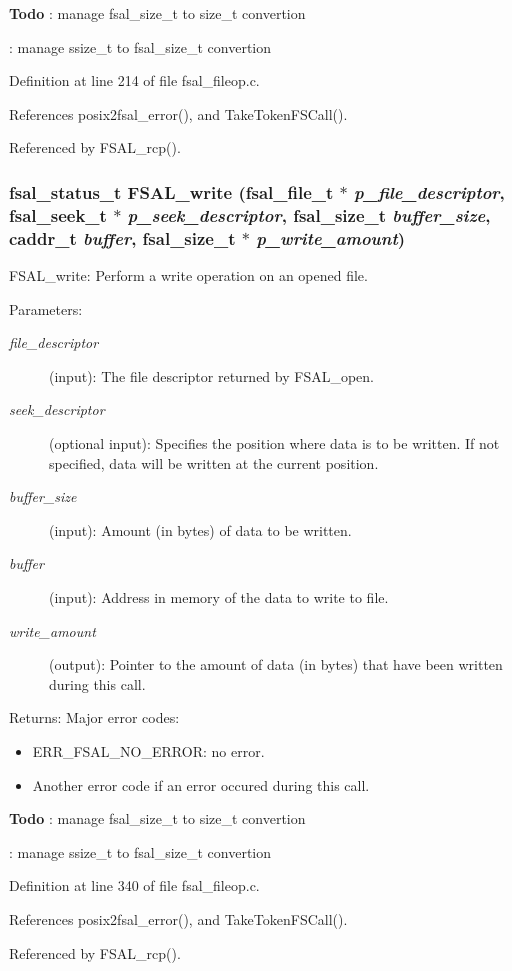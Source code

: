\begin{Desc}
\item[{\bf Todo}]: manage fsal\_\-size\_\-t to size\_\-t convertion 

: manage ssize\_\-t to fsal\_\-size\_\-t convertion\end{Desc}


Definition at line 214 of file fsal\_\-fileop.c.

References posix2fsal\_\-error(), and Take\-Token\-FSCall().

Referenced by FSAL\_\-rcp().
\subsubsection{\setlength{\rightskip}{0pt plus 5cm}fsal\_\-status\_\-t FSAL\_\-write (fsal\_\-file\_\-t $\ast$ {\em p\_\-file\_\-descriptor}, fsal\_\-seek\_\-t $\ast$ {\em p\_\-seek\_\-descriptor}, fsal\_\-size\_\-t {\em buffer\_\-size}, caddr\_\-t {\em buffer}, fsal\_\-size\_\-t $\ast$ {\em p\_\-write\_\-amount})}\label{fsal__fileop_8c_a3}


FSAL\_\-write: Perform a write operation on an opened file.

\begin{Desc}
\item[Parameters:]
\begin{description}
\item[{\em file\_\-descriptor}](input): The file descriptor returned by FSAL\_\-open. \item[{\em seek\_\-descriptor}](optional input): Specifies the position where data is to be written. If not specified, data will be written at the current position. \item[{\em buffer\_\-size}](input): Amount (in bytes) of data to be written. \item[{\em buffer}](input): Address in memory of the data to write to file. \item[{\em write\_\-amount}](output): Pointer to the amount of data (in bytes) that have been written during this call.\end{description}
\end{Desc}
\begin{Desc}
\item[Returns:]Major error codes:\begin{itemize}
\item ERR\_\-FSAL\_\-NO\_\-ERROR: no error.\item Another error code if an error occured during this call.\end{itemize}
\end{Desc}


\begin{Desc}
\item[{\bf Todo}]: manage fsal\_\-size\_\-t to size\_\-t convertion 

: manage ssize\_\-t to fsal\_\-size\_\-t convertion\end{Desc}


Definition at line 340 of file fsal\_\-fileop.c.

References posix2fsal\_\-error(), and Take\-Token\-FSCall().

Referenced by FSAL\_\-rcp().